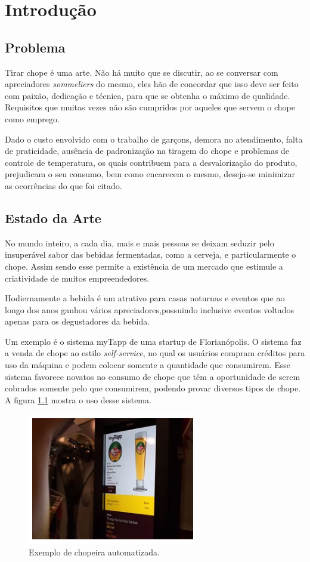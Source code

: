 \chapter[Introdução]{Introdução}

	\section[Problema]{Problema}

	Tirar chope é uma arte.  Não há muito que se discutir, ao se conversar com 
	apreciadores \textit{sommeliers} do mesmo, eles hão de concordar que isso 
	deve ser feito com paixão, dedicação  e técnica,  para que se obtenha o máximo de 
	qualidade. Requisitos que muitas vezes não são cumpridos por aqueles que servem o
	chope como emprego.
	
	Dado o custo  envolvido com o trabalho de garçons, demora no atendimento,
	falta de praticidade, ausência de padronização na tiragem do chope e problemas de
	controle de temperatura, os quais contribuem para a desvalorização do produto,
	prejudicam o seu consumo, bem como encarecem o mesmo, deseja-se 
	minimizar as ocorrências do que  foi citado. 	
	
	\section[Estado da Arte]{Estado da Arte}
	
	No mundo inteiro, a cada dia, mais e mais pessoas se deixam seduzir pelo insuperável sabor das bebidas fermentadas, como a cerveja, e particularmente o chope. Assim sendo esse permite a existência de um mercado que estimule a criatividade de muitos empreendedores.  

	Hodiernamente a bebida é um atrativo para casas noturnas e eventos que ao longo dos anos ganhou vários apreciadores,possuindo inclusive eventos voltados apenas para os degustadores da bebida. 

	Um exemplo é o sistema myTapp de uma startup de Florianópolis.  O sistema faz a venda de chope ao estilo 
	\textit{self-service}, no qual os usuários compram créditos para uso da máquina e podem colocar somente a quantidade que 
	consumirem. Esse sistema favorece novatos no consumo de chope que têm a oportunidade de serem cobrados somente 
	pelo que consumirem, podendo provar diversos tipos de chope. A figura \ref{exemplo-chopp} mostra o uso desse sistema.

	\begin{figure}[H]
		\centering
		\includegraphics[scale= 0.9]{figuras/exemplo-chopp.png}
		\caption{Exemplo de chopeira automatizada.}
		\label{exemplo-chopp}
	\end{figure}

